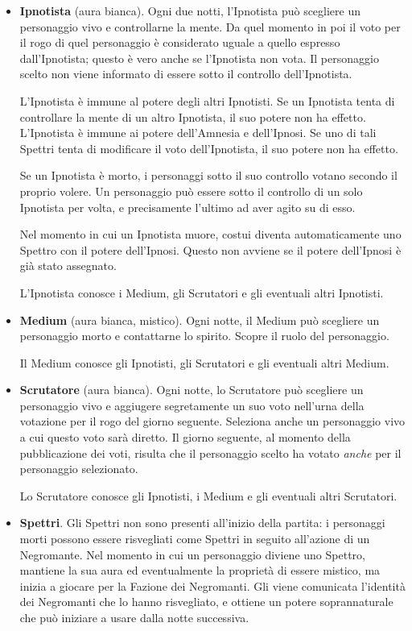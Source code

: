 \documentclass[a4paper,10pt]{article}
\begin{document}
\begin{itemize}
 \item {\bf Ipnotista} (aura bianca). Ogni due notti, l'Ipnotista può scegliere un personaggio vivo e controllarne la mente. Da quel momento in poi il voto per il rogo di quel personaggio è considerato uguale a quello espresso dall'Ipnotista; questo è vero anche se l'Ipnotista non vota.
 Il personaggio scelto non viene informato di essere sotto il controllo dell'Ipnotista.
 
 L'Ipnotista è immune al potere degli altri Ipnotisti. Se un Ipnotista tenta di controllare la mente di un altro Ipnotista, il suo potere non ha effetto.
 L'Ipnotista è immune ai potere dell'Amnesia e dell'Ipnosi. Se uno di tali Spettri tenta di modificare il voto dell'Ipnotista, il suo potere non ha effetto.

 Se un Ipnotista è morto, i personaggi sotto il suo controllo votano secondo il proprio volere.
 Un personaggio può essere sotto il controllo di un solo Ipnotista per volta, e precisamente l'ultimo ad aver agito su di esso.

 Nel momento in cui un Ipnotista %
 muore, costui diventa automaticamente uno Spettro con il potere dell'Ipnosi. Questo non avviene se il potere dell'Ipnosi è già stato assegnato.

 L'Ipnotista conosce i Medium, gli Scrutatori e gli eventuali altri Ipnotisti.

 \item {\bf Medium} (aura bianca, mistico). Ogni notte, il Medium può scegliere un personaggio morto e contattarne lo spirito. Scopre il ruolo del personaggio.

 Il Medium conosce gli Ipnotisti, gli Scrutatori e gli eventuali altri Medium.
 
 \item {\bf Scrutatore} (aura bianca). Ogni notte, lo Scrutatore può scegliere  un personaggio vivo e aggiugere segretamente un suo voto nell'urna della votazione per il rogo  del giorno seguente. Seleziona anche un personaggio vivo a cui questo voto sarà diretto. Il giorno seguente, al momento della pubblicazione dei voti, risulta che il personaggio scelto ha votato \emph{anche} per il personaggio selezionato.
 
 Lo Scrutatore conosce gli Ipnotisti, i Medium e gli eventuali altri Scrutatori.

 \item {\bf Spettri}. Gli Spettri non sono presenti all'inizio della partita: i personaggi morti possono essere risvegliati come Spettri in seguito all'azione di un Negromante.
 Nel momento in cui un personaggio diviene uno Spettro, mantiene la sua aura ed eventualmente la proprietà di essere mistico, ma inizia a giocare per la Fazione dei Negromanti. Gli viene comunicata l'identità dei Negromanti che lo hanno risvegliato, e ottiene un potere soprannaturale che può iniziare a usare dalla notte successiva. %
 

\end{itemize}
\end{document}
